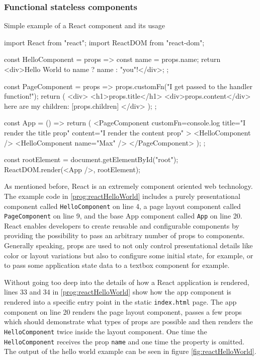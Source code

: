 \subsubsection{Functional stateless components}

\begin{program}
\caption{Simple example of a React component and its usage} 
\label{prog:reactHelloWorld}
\begin{JsCode}
import React from "react";
import ReactDOM from "react-dom";

const HelloComponent = props => {
  const name = props.name;
  return <div>Hello World to {name ? name : "you"}!</div>;
};

const PageComponent = props => {
  props.customFn("I get passed to the handler function!");
  return (
    <div>
      <h1>{props.title}</h1>
      <div>{props.content}</div>
      here are my children: [{props.children}]
    </div>
  );
};

const App = () => {
  return (
    <PageComponent
      customFn={console.log}
      title="I render the title prop"
      content="I render the content prop"
    >
      <HelloComponent />
      <HelloComponent name={"Max"} />
    </PageComponent>
  );
};

const rootElement = document.getElementById("root");
ReactDOM.render(<App />, rootElement);  
\end{JsCode}
\end{program}

As mentioned before, React is an extremely component oriented web technology. The example code in \ref{prog:reactHelloWorld} includes a purely presentational component called \texttt{HelloComponent} on line 4, a page layout component called \texttt{PageComponent} on line 9, and the base App component called \texttt{App} on line 20. React enables developers to create reusable and configurable components by providing the possibility to pass an arbitrary number of props to components. Generally speaking, props are used to not only control presentational details like color or layout variations but also to configure some initial state, for example, or to pass some application state data to a textbox component for example.

Without going too deep into the details of how a React application is rendered, lines 33 and 34 in \ref{prog:reactHelloWorld} show how the app component is rendered into a specific entry point in the static \texttt{index.html} page. The app component on line 20 renders the page layout component, passes a few props which should demonstrate what types of props are possible and then renders the \texttt{HelloComponent} twice inside the layout component. One time the \texttt{HelloComponent} receives the prop \texttt{name} and one time the property is omitted. The output of the hello world example can be seen in figure \ref{fig:reactHelloWorld}. 


